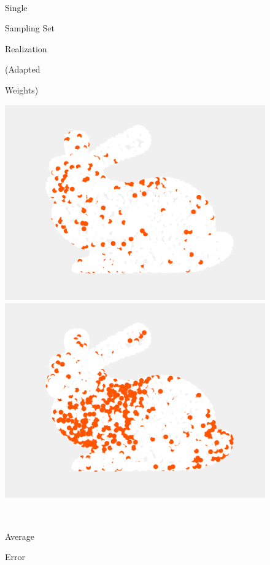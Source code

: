 \documentclass[journal, 10pt]{IEEEtran}
\begin{document}
\begin{figure}[H]
\begin{minipage}[m]{0.4\linewidth}
\end{minipage} \\
\begin{minipage}[m]{0.16\linewidth}
\centerline{\small{Single}}
\centerline{\small{Sampling Set}}
\centerline{\small{Realization}}
\centerline{\small{(Adapted}}
\centerline{\small{Weights)}}
\end{minipage}
\begin{minipage}[m]{0.4\linewidth}
\centerline{\includegraphics[width=.85\linewidth]{fig_rec_low_selected_adapted}}
\end{minipage}
\begin{minipage}[m]{0.4\linewidth}
\centerline{\includegraphics[width=.85\linewidth]{fig_rec_band_selected_adapted}}
\end{minipage} \\
\begin{minipage}[m]{0.16\linewidth}
\centerline{\small{Average}}
\centerline{\small{Error}}
\end{minipage}

\end{figure}
\end{document}
